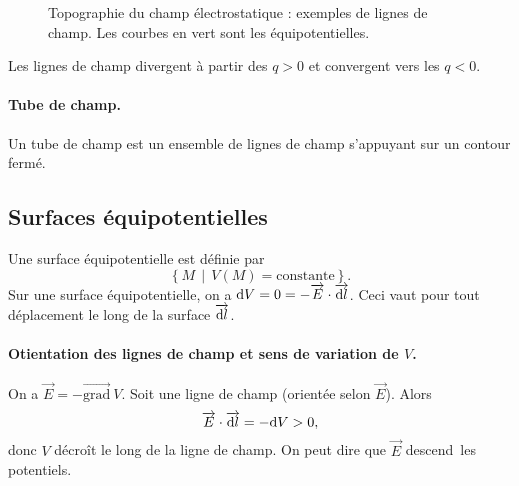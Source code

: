 \begin{figure}
            \caption[Topographie du champ électrostatique : exemples de lignes de champ.]{Topographie du champ électrostatique : exemples de lignes de champ. Les courbes en vert sont les équipotentielles.}
            \label{fig:ligne_de_champ_electrostatique}
        \end{figure}

        Les lignes de champ divergent à partir des $q>0$ et convergent vers les $q<0$.

        \paragraph{Tube de champ.}
        Un tube de champ est un ensemble de lignes de champ s'appuyant sur un contour fermé.

    \subsection{Surfaces équipotentielles}

        Une surface équipotentielle est définie par
        \begin{equation}
            \left\lbrace M\,\middle|\, V(M)=\text{constante}\right\rbrace.
        \end{equation}
        Sur une surface équipotentielle, on a $\mathrm{d} V=0=-\protect\overrightarrow{{E}}\cdot\protect\overrightarrow{{\mathrm{d} l}}$. Ceci vaut pour tout déplacement le long de la surface $\protect\overrightarrow{{\mathrm{d} l}}$.

        \paragraph{Otientation des lignes de champ et sens de variation de $V$.}
        On a $\vec{E}=-\vec{\text{grad}}~V$. Soit une ligne de champ (orientée selon $\vec{E}$). Alors 
        \begin{equation}
            \protect\overrightarrow{{E}}\cdot\protect\overrightarrow{{\mathrm{d} l}}=-\mathrm{d} V>0,
        \end{equation}
        donc $V$ décroît le long de la ligne de champ. On peut dire que $\vec{E}$ \og descend\fg~les potentiels.

